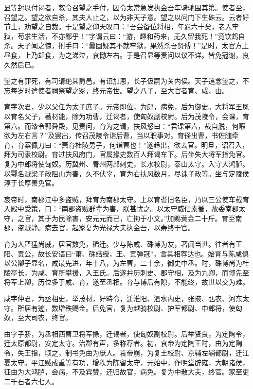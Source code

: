 \documentclass[12pt,UTF8]{ctexbook}
\begin{document}
显等封以付谒者，敕令召望之手付，因令太常急发执金吾车骑驰围其第。使者至，召望之。望之欲自杀，其夫人止之，以为非天子意。望之以问门下生硃云。云者好节士，劝望之自裁。于是望之仰天叹曰：“吾尝备位将相，年逾六十矣，老入牢狱，苟求生活，不亦鄙乎！”字谓云曰：“游，趣和药来，无久留我死！”竟饮鸩自杀。天子闻之惊，拊手曰：“曩固疑其不就牢狱，果然杀吾贤傅！”是时，太官方上昼食，上乃却食，为之涕泣，哀恸左右。于是召显等责问以议不详。皆免冠谢，良久然后已。



望之有罪死，有司请绝其爵邑。有诏加恩，长子伋嗣为关内侯。天子追念望之，不忘每岁时遣使者祠祭望之冢，终元帝世。望之八子，至大官者育、咸、由。



育字次君，少以父任为太子庶子。元帝即位，为郎，病免，后为御史。大将军王凤以育名父子，著材能，除为功曹，迁谒者，使匈奴副校尉。后为茂陵令，会课，育第六。而漆令郭舜殿，见责问，育为之请，扶风怒曰：“君课第六，裁自脱，何暇欲为左右言？”及罢出，传召茂陵令诣后曹，当以职事对。育径出曹，书佐随牵育，育案佩刀曰：“萧育杜陵男子，何诣曹也！”遂趋出，欲去官。明旦，诏召入，拜为司隶校尉。育过扶风府门，官属掾史数百人拜谒车下。后坐失大将军指免官。复为中郎将使匈奴。历冀州、青州两部刺史，长水校尉，泰山太守。入守大鸿胪。以鄠名贼梁子政阻山为害，久不伏辜，育为右扶风数月，尽诛子政等。坐与定陵侯淳于长厚善免官。



哀帝时，南郡江中多盗贼，拜育为南郡太守。上以育耆旧名臣，乃以三公使车载育入殿中受策，曰：“南郡盗贼群辈为害，朕甚忧之。以太守威信素著，故委南郡太守，之官，其于为民除害，安元元而已，亡拘于小文。”加赐黄金二十斤。育至南郡，盗贼静。病去官，起家复为光禄大夫执金吾，以寿终于官。



育为人严猛尚威，居官数免，稀迁。少与陈咸、硃博为友，著闻当世。往者有王阳、贡公，故长安语曰“萧、硃结绶，王、贡弹冠”，言其相荐达也。始育与陈咸俱以公卿子显名，咸最先进，年十八，为左曹，二十余，御史中丞。时，硃博尚为杜陵亭长，为咸、育所攀援，入王氏。后遂并历刺史、郡守相，及为九卿，而博先至将军上卿，历位多于咸、育，遂至丞相。育与博后有隙，不能终，故世以交为难。



咸字仲君，为丞相史，举茂材，好畤令，迁淮阳、泗水内史，张掖、弘农、河东太守。所居有迹，数增秩赐金。后免官，复为越骑校尉、护军都尉、中郎将，使匈奴，至大司农，终官。



由字子骄，为丞相西曹卫将军掾，迁谒者，使匈奴副校尉。后举贤良，为定陶令，迁太原都尉，安定太守。治郡有声，多称荐者。初，哀帝为定陶王时，由为定陶令，失王指，顷之，制书免由为庶人。哀帝崩，为复土校尉、京辅左辅都尉，迁江夏太守。平江贼成重等有功，增秩为陈留太守，元始中，作明堂辟雍，大朝诸侯，征由为大鸿胪，会病，不及宾赞，还归故官，病免。复为中散大夫，终官。家至吏二千石者六七人。
\end{document}
